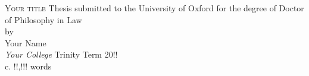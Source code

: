 \begin{titlepage}
\begin{center}
\vfill
{\Huge\textsc{Your title}}
\vfill
\large
Thesis submitted to the University of Oxford for the degree of Doctor of Philosophy in Law\\
by\\
Your Name\\
\textit{Your College}
\vfill
Trinity Term 20!!\\
c. !!,!!! words
\end{center}
\end{titlepage}
